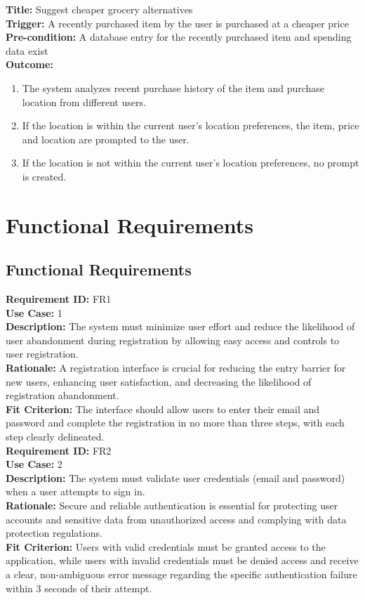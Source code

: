 \documentclass[12pt]{article}
\begin{document}
\medskip
\noindent \textbf{Title:} Suggest cheaper grocery alternatives\\
\textbf{Trigger:} A recently purchased item by the user is purchased at a cheaper price\\
\textbf{Pre-condition:} A database entry for the recently purchased item and spending data exist\\
\textbf{Outcome:}
\begin{enumerate}
  \item The system analyzes recent purchase history of the item and purchase location from different users.
  \item If the location is within the current user's location preferences, the item, price and location are
  prompted to the user.
  \item If the location is not within the current user's location preferences, no prompt is created.
\end{enumerate}

\section{Functional Requirements}
\subsection{Functional Requirements}
\medskip
\noindent \textbf{Requirement ID:} FR1\\
\textbf{Use Case:} 1\\
\textbf{Description:} The system must minimize user effort and reduce the likelihood of user abandonment during registration by allowing easy access and controls to user registration.\\
\textbf{Rationale:} A registration interface is crucial for reducing the entry barrier for new users, enhancing user satisfaction, and decreasing the likelihood of registration abandonment.\\
\textbf{Fit Criterion:} The interface should allow users to enter their email and password and complete the registration in no more than three steps, with each step clearly delineated.\\

\medskip
\noindent \textbf{Requirement ID:} FR2\\
\textbf{Use Case:} 2\\
\textbf{Description:} The system must validate user credentials (email and password) when a user attempts to sign in.\\
\textbf{Rationale:}  Secure and reliable authentication is essential for protecting user accounts and sensitive data from unauthorized access and complying with data protection regulations.\\
\textbf{Fit Criterion:} Users with valid credentials must be granted access to the application, while users with invalid credentials must be denied access and receive a clear, non-ambiguous error message regarding the specific authentication failure within 3 seconds of their attempt.\\
\end{document}
